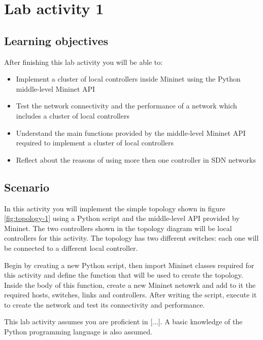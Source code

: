 \section*{Lab activity 1}





\subsection*{Learning objectives}
After finishing this lab activity you will be able to:
\begin{itemize}
  \item Implement a cluster of local controllers inside Mininet using the Python
  middle-level Mininet API
  \item Test the network connectivity and the performance of a network which
  includes a cluster of local controllers
  \item Understand the main functions provided by the middle-level Mininet API required
  to implement a cluster of local controllers
  \item Reflect about the reasons of using more then one controller in SDN networks
\end{itemize}






\subsection*{Scenario}
In this activity you will implement the simple topology shown in figure \ref{fig:topology-1} using
a Python script and the middle-level API provided by Mininet. The two controllers
shown in the topology diagram will be local controllers for this activity.
The topology has two different switches: each one will be connected to a different
local controller.

Begin by creating a new Python script, then import Mininet classes required for
this activity and define the function that will be used to create the topology.
Inside the body of this function, create a new Mininet netowrk and add to it the
required hosts, switches, links and controllers. After writing the script, execute
it to create the network and test its connectivity and performance.

This lab activity assumes you are proficient in [...]. A basic knowledge of the
Python programming language is also assumed.





